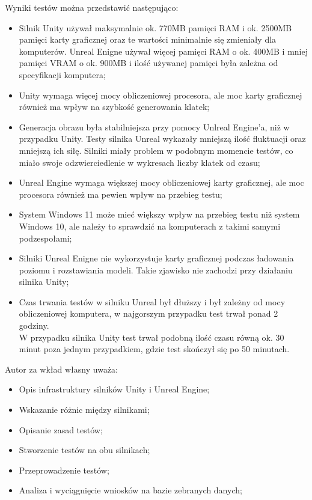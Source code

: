 \documentclass[12pt,twoside]{article}
\begin{document}
Wyniki testów można przedstawić następująco:
\begin{itemize}
\item Silnik Unity używał maksymalnie ok. 770MB pamięci RAM i ok. 2500MB pamięci
karty graficznej oraz te wartości minimalnie się zmieniały dla komputerów.
Unreal Enigne używał więcej pamięci RAM o ok. 400MB i mniej pamięci VRAM o ok.
900MB i ilość używanej pamięci była zależna od specyfikacji komputera; 

\item Unity wymaga więcej mocy obliczeniowej procesora, ale moc karty graficznej
również ma wpływ na szybkość generowania klatek;

\item Generacja obrazu była stabilniejsza przy pomocy Unlreal Engine’a, niż w
przypadku Unity. Testy silnika Unreal wykazały mniejszą ilość fluktuacji oraz mniejszą ich siłę. Silniki miały problem w podobnym momencie testów, co miało
swoje odzwierciedlenie w wykresach liczby klatek od czasu;


\item Unreal Engine wymaga większej mocy obliczeniowej karty graficznej, ale moc
procesora również ma pewien wpływ na przebieg testu;

\item System Windows 11 może mieć większy wpływ na przebieg testu niż system
Windows 10, ale należy to sprawdzić na komputerach z takimi samymi podzespołami;

\item Silniki Unreal Enigne nie wykorzystuje karty graficznej podczas ładowania
poziomu i rozstawiania modeli. Takie zjawisko nie zachodzi przy działaniu
silnika Unity;

\item Czas trwania testów w silniku Unreal był dłuższy i był zależny od mocy
obliczeniowej komputera, w najgorszym przypadku test trwał ponad 2 godziny.\\W
przypadku silnika Unity test trwał podobną ilość czasu równą ok. 30 minut poza
jednym przypadkiem, gdzie test skończył się po 50 minutach. 


\end{itemize} 
Autor za wkład własny uważa:
\begin{itemize}
\item Opis infrastruktury silników Unity i Unreal Engine;
\item Wskazanie różnic między silnikami;
\item Opisanie zasad testów;
\item Stworzenie testów na obu silnikach;
\item Przeprowadzenie testów;
\item Analiza i wyciągnięcie wniosków na bazie zebranych danych;
\end{itemize}
\end{document}
